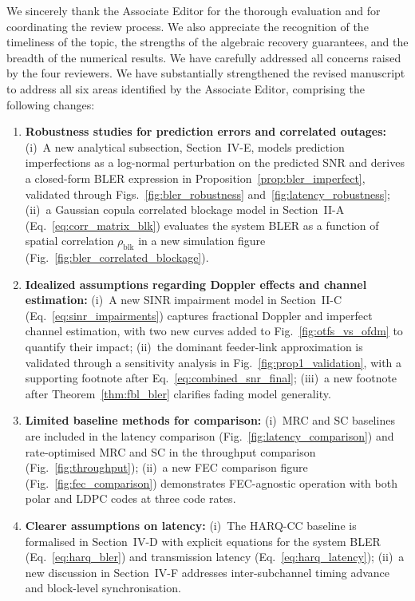 We sincerely thank the Associate Editor for the thorough evaluation and for coordinating the review process. We also appreciate the recognition of the timeliness of the topic, the strengths of the algebraic recovery guarantees, and the breadth of the numerical results. We have carefully addressed all concerns raised by the four reviewers. We have substantially strengthened the revised manuscript to address all six areas identified by the Associate Editor, comprising the following changes:
\begin{enumerate}
\item \textbf{Robustness studies for prediction errors and correlated outages:} (i)~A new analytical subsection, Section~IV-E, models prediction imperfections as a log-normal perturbation on the predicted SNR and derives a closed-form BLER expression in Proposition~\ref{prop:bler_imperfect}, validated through Figs.~\ref{fig:bler_robustness} and~\ref{fig:latency_robustness}; (ii)~a Gaussian copula correlated blockage model in Section~II-A (Eq.~\eqref{eq:corr_matrix_blk}) evaluates the system BLER as a function of spatial correlation $\rho_{\mathrm{blk}}$ in a new simulation figure (Fig.~\ref{fig:bler_correlated_blockage}).

\item \textbf{Idealized assumptions regarding Doppler effects and channel estimation:} (i)~A new SINR impairment model in Section~II-C (Eq.~\eqref{eq:sinr_impairments}) captures fractional Doppler and imperfect channel estimation, with two new curves added to Fig.~\ref{fig:otfs_vs_ofdm} to quantify their impact; (ii)~the dominant feeder-link approximation is validated through a sensitivity analysis in Fig.~\ref{fig:prop1_validation}, with a supporting footnote after Eq.~\eqref{eq:combined_snr_final}; (iii)~a new footnote after Theorem~\ref{thm:fbl_bler} clarifies fading model generality.

\item \textbf{Limited baseline methods for comparison:} (i)~MRC and SC baselines are included in the latency comparison (Fig.~\ref{fig:latency_comparison}) and rate-optimised MRC and SC in the throughput comparison (Fig.~\ref{fig:throughput}); (ii)~a new FEC comparison figure (Fig.~\ref{fig:fec_comparison}) demonstrates FEC-agnostic operation with both polar and LDPC codes at three code rates.

\item \textbf{Clearer assumptions on latency:} (i)~The HARQ-CC baseline is formalised in Section~IV-D with explicit equations for the system BLER (Eq.~\eqref{eq:harq_bler}) and transmission latency (Eq.~\eqref{eq:harq_latency}); (ii)~a new discussion in Section~IV-F addresses inter-subchannel timing advance and block-level synchronisation.


\end{enumerate}
